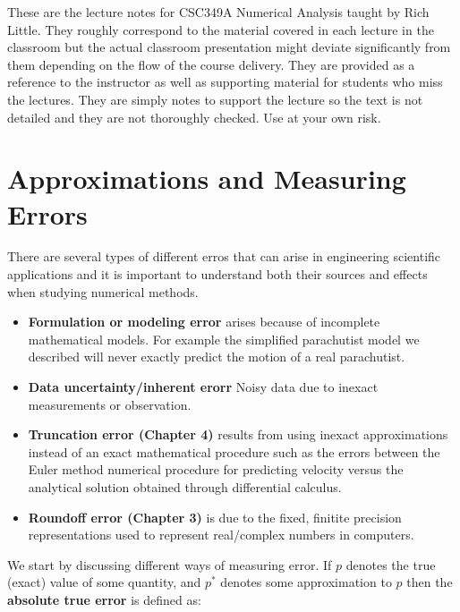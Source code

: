 \documentclass [titlepage,12pt,letter] {article}
\begin{document}
 


These are the lecture notes for CSC349A Numerical Analysis taught by
Rich Little. They roughly correspond to
the material covered in each lecture in the classroom but the actual
classroom presentation might deviate significantly from them depending
on the flow of the course delivery. They are provided as a reference to
the instructor as well as supporting material for students who miss
the lectures. They are simply notes to support the lecture so the text
is not detailed and they are not thoroughly checked. Use at your own
risk.
    
\section{Approximations and Measuring Errors} 

There are several types of different erros that can arise in
engineering scientific applications and it is important to understand
both their sources and effects when studying numerical methods. 

\begin{itemize} 
\item{{\bf Formulation or modeling error}  arises because of
    incomplete mathematical models. For example the simplified
    parachutist model we described will never exactly predict the
    motion of a real parachutist.}

\item{{\bf Data uncertainty/inherent erorr} Noisy data due to inexact
    measurements or observation.}

\item{{\bf Truncation error (Chapter 4)} results from using inexact approximations
    instead of an exact mathematical procedure such as the errors
    between the Euler method numerical procedure for predicting
    velocity versus the analytical solution obtained through
    differential calculus.}

\item{{\bf Roundoff error (Chapter 3)} is due to the fixed, finitite
    precision representations used to represent real/complex numbers
    in computers.}


\end{itemize} 


We start by discussing different ways of measuring error. If $p$
denotes the true (exact) value of some quantity, and $p^{*}$ denotes
some approximation to $p$ then the {\bf absolute true error} is
defined as: 
\end{document}
